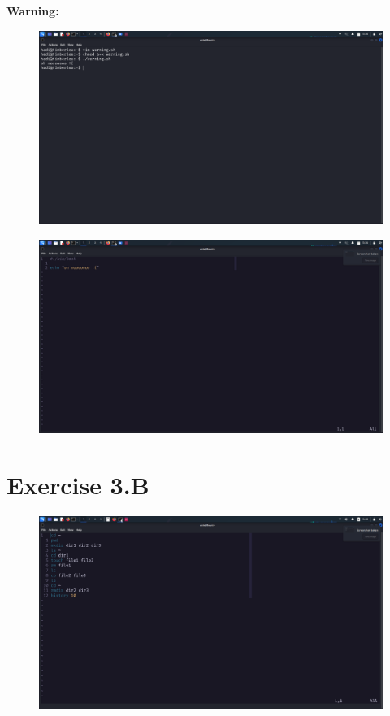 \documentclass{article}
\numberwithin{equation}{subsection}
\begin{document}
	\newpage
	\textbf{Warning:}
	\begin{figure}[H]
		\includegraphics[width=400pt]{images/e3qA/3.png}
	\end{figure}
	\begin{figure}[H]
		\includegraphics[width=400pt]{images/e3qA/4.png}
	\end{figure}

	\section{Exercise 3.B}
	\begin{figure}[H]
			\includegraphics[width=400pt]{images/3b1.png}
	\end{figure}
\end{document}
